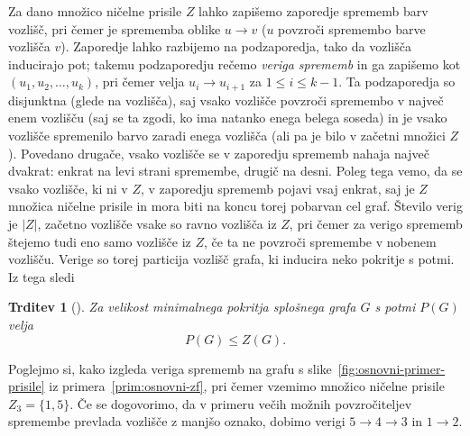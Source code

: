 \documentclass[12pt,a4paper,twoside]{article}
\theoremstyle{definition} %
\theoremstyle{plain} %
\newtheorem{trditev}[definicija]{Trditev}
\numberwithin{equation}{section}  %
\begin{document}
Za dano množico ničelne prisile $Z$ lahko zapišemo zaporedje sprememb barv vozlišč, pri čemer je sprememba oblike $u \rightarrow v$ ($u$ povzroči spremembo barve vozlišča $v$). Zaporedje lahko razbijemo na podzaporedja, tako da vozlišča inducirajo pot; takemu podzaporedju rečemo \emph{veriga sprememb} in ga zapišemo kot $(u_1, u_2, \ldots, u_k)$, pri čemer velja $u_i \rightarrow u_{i+1}$ za $1 \leq i \leq k-1$.  Ta podzaporedja so disjunktna (glede na vozlišča), saj vsako vozlišče povzroči spremembo v največ enem vozlišču (saj se ta zgodi, ko ima natanko enega belega soseda) in je vsako vozlišče spremenilo barvo zaradi enega vozlišča (ali pa je bilo v začetni množici $Z$). Povedano drugače, vsako vozlišče se v zaporedju sprememb nahaja največ dvakrat: enkrat na levi strani spremembe, drugič na desni. Poleg tega vemo, da se vsako vozlišče, ki ni v $Z$, v zaporedju sprememb pojavi vsaj enkrat, saj je $Z$ množica ničelne prisile in mora biti na koncu torej pobarvan cel graf. Število verig je $|Z|$, začetno vozlišče vsake so ravno vozlišča iz $Z$, pri čemer za verigo sprememb štejemo tudi eno samo vozlišče iz $Z$, če ta ne povzroči spremembe v nobenem vozlišču. Verige so torej particija vozlišč grafa, ki inducira neko pokritje s potmi. Iz tega sledi
\begin{trditev}[{\cite[trditev~2.10]{barioli2010zero}}]
    Za velikost minimalnega pokritja splošnega grafa $G$ s potmi $P(G)$ velja
    \begin{equation}
        \label{eq:neenakost-path-cover-zf}
        P(G) \leq Z(G).
    \end{equation}
\end{trditev}
Poglejmo si, kako izgleda veriga sprememb na grafu s slike~\ref{fig:osnovni-primer-prisile} iz primera~\ref{prim:osnovni-zf}, pri čemer vzemimo množico ničelne prisile $Z_3 = \{1,5\}$. Če se dogovorimo, da v primeru večih možnih povzročiteljev spremembe prevlada vozlišče z manjšo oznako, dobimo verigi $5 \rightarrow 4 \rightarrow 3$ in $1 \rightarrow 2$.
\end{document}
